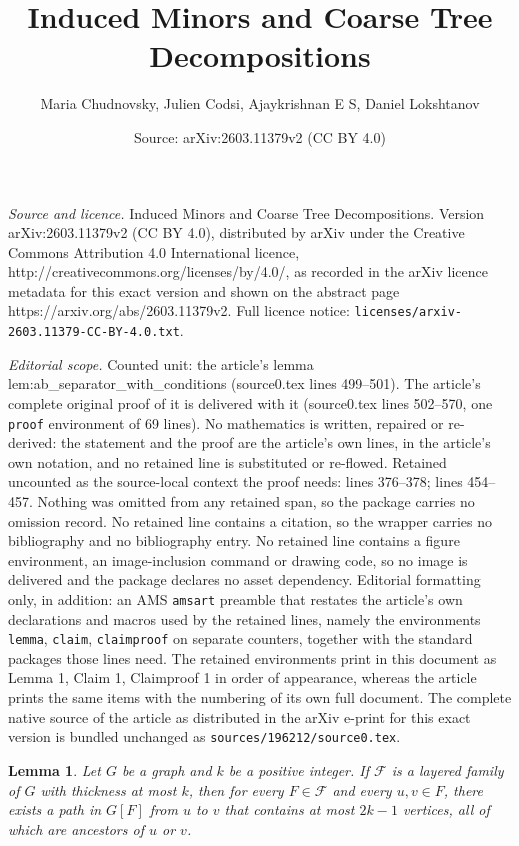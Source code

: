 \documentclass[10pt,a4paper]{amsart}
\title{Induced Minors and Coarse Tree Decompositions}
\author{Maria Chudnovsky, Julien Codsi, Ajaykrishnan E S, Daniel Lokshtanov}
\date{Source: arXiv:2603.11379v2 (CC BY 4.0)}
\newtheorem{lemma}{Lemma}
\newcommand{\f}{\mathcal{F}}
\begin{document}
\maketitle

\noindent\emph{Source and licence.} Induced Minors and Coarse Tree Decompositions. Version arXiv:2603.11379v2 (CC BY 4.0), distributed by arXiv under the Creative Commons Attribution 4.0 International licence, http://creativecommons.org/licenses/by/4.0/, as recorded in the arXiv licence metadata for this exact version and shown on the abstract page https://arxiv.org/abs/2603.11379v2. Full licence notice: \texttt{licenses/arxiv-2603.11379-CC-BY-4.0.txt}.\par\smallskip

\noindent\textit{Editorial scope.} Counted unit: the article's lemma lem:ab\_separator\_with\_conditions (source0.tex lines 499--501). The article's complete original proof of it is delivered with it (source0.tex lines 502--570, one \texttt{proof} environment of 69 lines). No mathematics is written, repaired or re-derived: the statement and the proof are the article's own lines, in the article's own notation, and no retained line is substituted or re-flowed.  Retained uncounted as the source-local context the proof needs: lines 376--378; lines 454--457.  Nothing was omitted from any retained span, so the package carries no omission record.  No retained line contains a citation, so the wrapper carries no bibliography and no bibliography entry.  No retained line contains a figure environment, an image-inclusion command or drawing code, so no image is delivered and the package declares no asset dependency.  Editorial formatting only, in addition: an AMS \texttt{amsart} preamble that restates the article's own declarations and macros used by the retained lines, namely the environments \texttt{lemma}, \texttt{claim}, \texttt{claimproof} on separate counters, together with the standard packages those lines need.  The retained environments print in this document as Lemma 1, Claim 1, Claimproof 1 in order of appearance, whereas the article prints the same items with the numbering of its own full document.  The complete native source of the article as distributed in the arXiv e-print for this exact version is bundled unchanged as \texttt{sources/196212/source0.tex}.
\begin{lemma}\label{lem:ancestral_path}
    Let $G$ be a graph and $k$ be a positive integer. If $\f$ is a layered family of $G$ with thickness at most $k$, then for every $F \in \f$ and every $u,v \in F$, there exists a path in $G[F]$ from $u$ to $v$ that contains at most $2k-1$ vertices, all of which are ancestors of $u$ or $v$.
\end{lemma}
\end{document}
